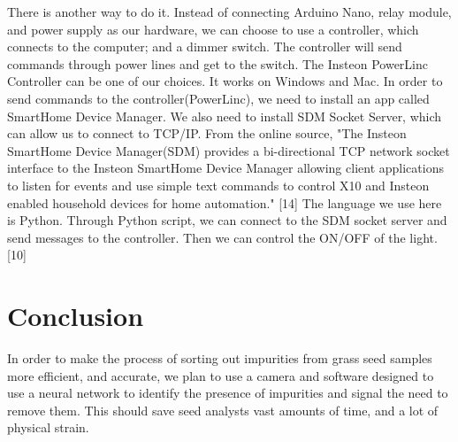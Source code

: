 \documentclass[onecolumn, draftclsnofoot,10pt, compsoc]{IEEEtran}
\begin{document}
There is another way to do it. Instead of connecting Arduino Nano, relay module, and power supply as our hardware, we can choose to use a controller, which connects to the computer; and a dimmer switch. The controller will send commands through power lines and get to the switch. The Insteon PowerLinc Controller can be one of our choices. It works on Windows and Mac. In order to send commands to the controller(PowerLinc), we need to install an app called SmartHome Device Manager. We also need to install SDM Socket Server, which can allow us to connect to TCP/IP. From the online source, "The Insteon SmartHome Device Manager(SDM) provides a bi-directional TCP network socket interface to the Insteon SmartHome Device Manager allowing client applications to listen for events and use simple text commands to control X10 and Insteon enabled household devices for home automation." [14] The language we use here is Python. Through Python script, we can connect to the SDM socket server and send messages to the controller. Then we can control the ON/OFF of the light. [10]
\pagebreak

\section{Conclusion}
In order to make the process of sorting out impurities from grass seed samples more efficient, and accurate, we plan to use a camera and software designed to use a neural network to identify the presence of impurities and signal the need to remove them. This should save seed analysts vast amounts of time, and a lot of physical strain.
\pagebreak
\end{document}
